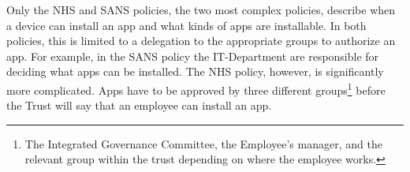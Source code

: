 \documentclass{llncs}
\newenvironment{policyrule}[1]{%
  \begin{mdframed}\footnotesize
      \noindent\textbf{\sffamily #1}:~\itshape%
}{%
  \end{mdframed}
}
\begin{document}
Only the NHS and SANS policies, the two most complex policies, describe when a device can install an app and what kinds of apps are installable.
In both policies, this is limited to a delegation to the appropriate groups to authorize an app.
For example, in the SANS policy the IT-Department are responsible for deciding what apps can be installed.
The NHS policy, however, is significantly more complicated.
Apps have to be approved by three different groups\footnote{The Integrated Governance Committee, the Employee's manager, and the relevant group within the trust depending on where the employee works.} before the Trust will say that an employee can install an app.
\end{document}
